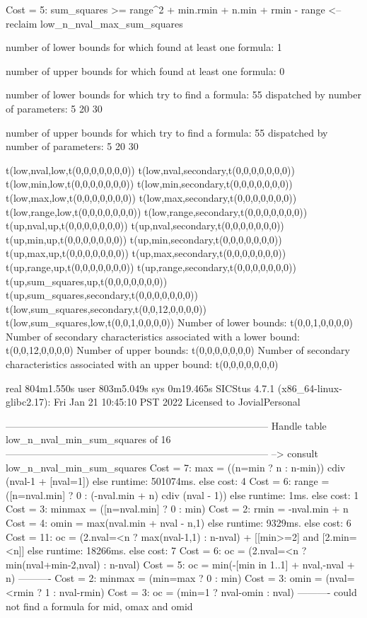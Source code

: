 Cost =  5:  sum_squares >= range^2 + min.rmin + n.min + rmin - range
<-- reclaim low_n_nval_max_sum_squares

number of lower bounds for which found at least one formula: 1

number of upper bounds for which found at least one formula: 0

number of lower bounds for which try to find a formula: 55
dispatched by number of parameters: 5  20  30

number of upper bounds for which try to find a formula: 55
dispatched by number of parameters: 5  20  30

t(low,nval,low,t(0,0,0,0,0,0,0))
t(low,nval,secondary,t(0,0,0,0,0,0,0))
t(low,min,low,t(0,0,0,0,0,0,0))
t(low,min,secondary,t(0,0,0,0,0,0,0))
t(low,max,low,t(0,0,0,0,0,0,0))
t(low,max,secondary,t(0,0,0,0,0,0,0))
t(low,range,low,t(0,0,0,0,0,0,0))
t(low,range,secondary,t(0,0,0,0,0,0,0))
t(up,nval,up,t(0,0,0,0,0,0,0))
t(up,nval,secondary,t(0,0,0,0,0,0,0))
t(up,min,up,t(0,0,0,0,0,0,0))
t(up,min,secondary,t(0,0,0,0,0,0,0))
t(up,max,up,t(0,0,0,0,0,0,0))
t(up,max,secondary,t(0,0,0,0,0,0,0))
t(up,range,up,t(0,0,0,0,0,0,0))
t(up,range,secondary,t(0,0,0,0,0,0,0))
t(up,sum_squares,up,t(0,0,0,0,0,0,0))
t(up,sum_squares,secondary,t(0,0,0,0,0,0,0))
t(low,sum_squares,secondary,t(0,0,12,0,0,0,0))
t(low,sum_squares,low,t(0,0,1,0,0,0,0))
Number of lower bounds:                                             t(0,0,1,0,0,0,0)
Number of secondary characteristics associated with a lower bound:  t(0,0,12,0,0,0,0)
Number of upper bounds:                                             t(0,0,0,0,0,0,0)
Number of secondary characteristics associated with an upper bound: t(0,0,0,0,0,0,0)

real	804m1.550s
user	803m5.049s
sys	0m19.465s
SICStus 4.7.1 (x86_64-linux-glibc2.17): Fri Jan 21 10:45:10 PST 2022
Licensed to JovialPersonal


--------------------------------------------------------------------------------
Handle table low_n_nval_min_sum_squares of 16
--------------------------------------------------------------------------------
--> consult low_n_nval_min_sum_squares
Cost =  7:  max    = ((n=min ? n : n-min)) cdiv (nval-1 + [nval=1]) %
else runtime: 501074ms. else cost: 4
Cost =  6:  range  = ([n=nval.min] ? 0 : (-nval.min + n) cdiv (nval - 1)) %
else runtime: 1ms. else cost: 1
Cost =  3:  minmax = ([n=nval.min] ? 0 : min) %
Cost =  2:  rmin   = -nval.min + n
Cost =  4:  omin   = max(nval.min + nval - n,1)
else runtime: 9329ms. else cost: 6
Cost = 11:  oc     = (2.nval=<n ? max(nval-1,1) : n-nval) + [[min>=2] and [2.min=<n]] %
else runtime: 18266ms. else cost: 7
Cost =  6:  oc     = (2.nval=<n ? min(nval+min-2,nval) : n-nval) %
Cost =  5:  oc     = min(-[min in 1..1] + nval,-nval + n)
----------
Cost =  2:  minmax = (min=max ? 0 : min)
Cost =  3:  omin   = (nval=<rmin ? 1 : nval-rmin)
Cost =  3:  oc     = (min=1 ? nval-omin : nval)
----------
could not find a formula for mid, omax and omid

